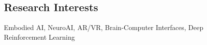\subsection*{\textbf{Research Interests}}
Embodied AI, NeuroAI, AR/VR, Brain-Computer Interfaces, Deep Reinforcement Learning %
